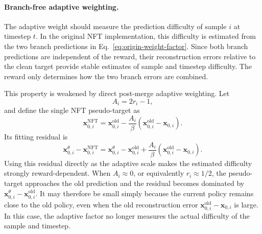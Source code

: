 \documentclass{article} %
\begin{document}
\paragraph{Branch-free adaptive weighting.}
The adaptive weight should measure the prediction difficulty of sample \(i\) at
timestep \(t\). In the original NFT implementation, this difficulty is
estimated from the two branch predictions in
Eq.~\ref{eq:origin-weight-factor}. Since both branch predictions are
independent of the reward, their reconstruction errors relative to the clean
target provide stable estimates of sample and timestep difficulty. The reward
only determines how the two branch errors are combined.

This property is weakened by direct post-merge adaptive weighting. Let
\begin{equation}
A_i=2r_i-1,
\end{equation}
and define the single NFT pseudo-target as
\begin{equation}
\mathbf{x}_{0,i}^{\mathrm{NFT}}
=
\mathbf{x}_{0,i}^{\mathrm{old}}
-
\frac{A_i}{\beta}
\left(
\mathbf{x}_{0,i}^{\mathrm{old}}
-
\mathbf{x}_{0,i}
\right).
\end{equation}
Its fitting residual is
\begin{equation}
\mathbf{x}_{0,i}^{\theta}
-
\mathbf{x}_{0,i}^{\mathrm{NFT}}
=
\mathbf{x}_{0,i}^{\theta}
-
\mathbf{x}_{0,i}^{\mathrm{old}}
+
\frac{A_i}{\beta}
\left(
\mathbf{x}_{0,i}^{\mathrm{old}}
-
\mathbf{x}_{0,i}
\right).
\label{eq:nft_single_target_residual}
\end{equation}
Using this residual directly as the adaptive scale makes the estimated
difficulty strongly reward-dependent. When \(A_i\approx0\), or equivalently
\(r_i\approx1/2\), the pseudo-target approaches the old prediction and the
residual becomes dominated by
\(\mathbf{x}_{0,i}^{\theta}-\mathbf{x}_{0,i}^{\mathrm{old}}\). It may therefore
be small simply because the current policy remains close to the old policy,
even when the old reconstruction error
\(\mathbf{x}_{0,i}^{\mathrm{old}}-\mathbf{x}_{0,i}\) is large. In this case,
the adaptive factor no longer measures the actual difficulty of the sample and
timestep.
\end{document}
